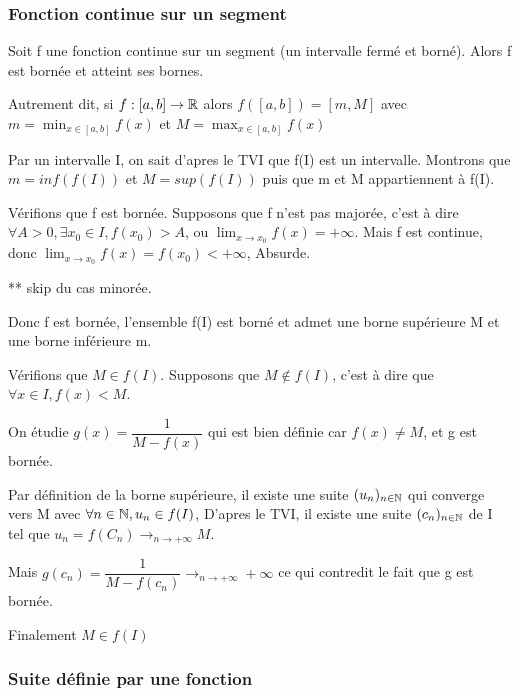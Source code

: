\documentclass[a4paper, 12pt]{article}
\begin{document}
\subsubsection{Fonction continue sur un segment}

\begin{theorem}
    Soit f une fonction continue sur un segment (un intervalle fermé et borné).
    Alors f est bornée et atteint ses bornes.

    Autrement dit, si $f: [a, b] \rightarrow \mathbb{R}$ alors $f([a, b]) = [m, M]$ avec $m = \min_{x \in [a, b]}f(x)$ et $M = \max_{x \in [a, b]}f(x)$
\end{theorem}

\begin{demonstration}
    Par un intervalle I, on sait d'apres le TVI que f(I) est un intervalle. Montrons que $m = inf(f(I))$
    et $M = sup(f(I))$ puis que m et M appartiennent à f(I).

    Vérifions que f est bornée. Supposons que f n'est pas majorée, c'est à dire
    $\forall A \gt 0, \exists x_0 \in I, f(x_0) \gt A$, ou $\lim_{x \to x_0}f(x) = +\infty$.
    Mais f est continue, donc $\lim_{x \to x_0}f(x) = f(x_0) \lt +\infty$, Absurde.

    ** skip du cas minorée.

    Donc f est bornée, l'ensemble f(I) est borné et admet une borne supérieure M et une borne inférieure m.

    Vérifions que $M \in f(I)$. Supposons que $M \notin f(I)$, c'est à dire que $\forall x \in I, f(x) \lt M$.

    On étudie $g(x) = \dfrac{1}{M - f(x)}$ qui est bien définie car $f(x) \neq M$, et g est bornée.

    Par définition de la borne supérieure, il existe une suite $(u_n)_{n \in \mathbb{N}}$ qui converge vers M avec
    $\forall n \in \mathbb{N}, u_n \in f(I)$, D'apres le TVI, il existe une suite $(c_n)_{n \in \mathbb{N}}$ de I tel que $u_n = f(C_n) \rightarrow_{n \to +\infty} M$.

    Mais $g(c_n) = \dfrac{1}{M - f(c_n)} \rightarrow_{n \to +\infty} + \infty$ ce qui contredit le fait que g est bornée.

    Finalement $M \in f(I)$
\end{demonstration}

\subsubsection{Suite définie par une fonction}
\end{document}
